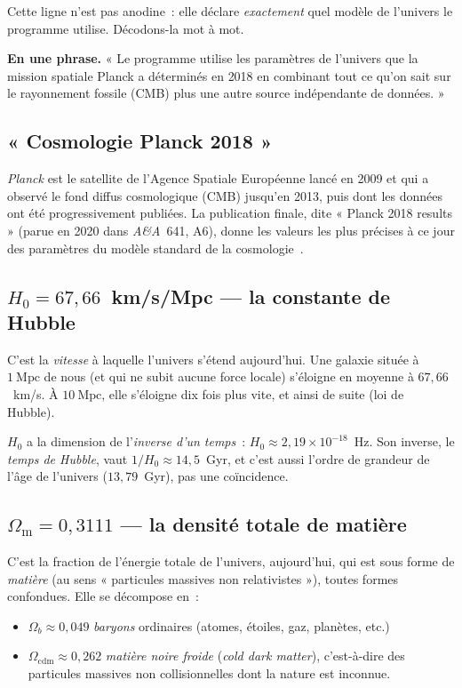 \documentclass[11pt,a4paper,openany]{report}
\newcommand{\Mpc}{\text{Mpc}}
\newcommand{\Hzero}{H_{0}}
\newcommand{\Om}{\Omega_{\mathrm{m}}}
\begin{document}
\noindent Cette ligne n'est pas anodine~: elle déclare \emph{exactement} quel
modèle de l'univers le programme utilise. Décodons-la mot à mot.

\begin{tcolorbox}[vulgarisation]
\textbf{En une phrase.} « Le programme utilise les paramètres de l'univers que la
mission spatiale Planck a déterminés en 2018 en combinant tout ce qu'on sait sur
le rayonnement fossile (CMB) plus une autre source indépendante de données. »
\end{tcolorbox}

\subsection{« Cosmologie Planck 2018 »}

\emph{Planck} est le satellite de l'Agence Spatiale Européenne lancé en 2009
et qui a observé le fond diffus cosmologique (CMB) jusqu'en 2013, puis dont
les données ont été progressivement publiées. La publication finale, dite
« Planck 2018 results » (parue en 2020 dans \emph{A\&A}~641, A6), donne les
valeurs les plus précises à ce jour des paramètres du modèle standard de la
cosmologie~\cite{Planck2018}.

\subsection{$\Hzero=67{,}66$~km/s/Mpc --- la constante de Hubble}

C'est la \emph{vitesse} à laquelle l'univers s'étend aujourd'hui. Une galaxie
située à $1~\Mpc$ de nous (et qui ne subit aucune force locale) s'éloigne en
moyenne à $67{,}66$~km/s. À $10~\Mpc$, elle s'éloigne dix fois plus vite, et
ainsi de suite (loi de Hubble).

\begin{tcolorbox}[attention]
$\Hzero$ a la dimension de l'\emph{inverse d'un temps}~: $\Hzero \approx
2{,}19\times 10^{-18}$~Hz. Son inverse, le \emph{temps de Hubble}, vaut
$1/\Hzero \approx 14{,}5$~Gyr, et c'est aussi l'ordre de grandeur de l'âge de
l'univers ($13{,}79$~Gyr), pas une coïncidence.
\end{tcolorbox}

\subsection{$\Om = 0{,}3111$ --- la densité totale de matière}

C'est la fraction de l'énergie totale de l'univers, aujourd'hui, qui est
sous forme de \emph{matière} (au sens « particules massives non relativistes »),
toutes formes confondues. Elle se décompose en~:
\begin{itemize}[topsep=2pt]
\item $\Omega_b \approx 0{,}049$ \emph{baryons} ordinaires (atomes, étoiles,
  gaz, planètes, etc.)
\item $\Omega_{\mathrm{cdm}} \approx 0{,}262$ \emph{matière noire froide}
  (\emph{cold dark matter}), c'est-à-dire des particules massives non
  collisionnelles dont la nature est inconnue.
\end{itemize}
\end{document}
